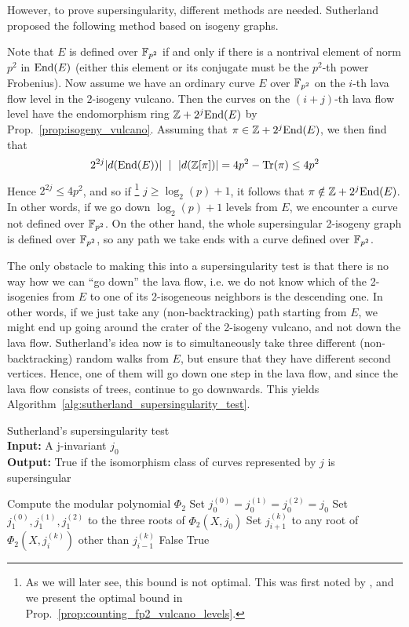 However, to prove supersingularity, different methods are needed.
Sutherland \cite{sutherland_supersingularity_test} proposed the following method based on isogeny graphs.

Note that $E$ is defined over $\mathbb{F}_{p^2}$ if and only if there is a nontrival element of norm $p^2$ in $\mathrm{End}(E)$ (either this element or its conjugate must be the $p^2$-th power Frobenius).
Now assume we have an ordinary curve $E$ over $\mathbb{F}_{p^2}$ on the $i$-th lava flow level in the $2$-isogeny vulcano.
Then the curves on the $(i + j)$-th lava flow level have the endomorphism ring $\mathbb{Z} + 2^j\mathrm{End}(E)$ by Prop.~\ref{prop:isogeny_vulcano}.
Assuming that $\pi \in \mathbb{Z} + 2^j\mathrm{End}(E)$, we then find that
\begin{equation*}
    2^{2j} |d(\mathrm{End}(E))| \ \mid \  |d(\mathbb{Z}[\pi])| = 4p^2 - \mathrm{Tr}(\pi) \leq 4p^2
\end{equation*}
Hence $2^{2j} \leq 4p^2$, and so if
\footnote{As we will later see, this bound is not optimal. This was first noted by \cite{fp_supersingularity_tests}, and we present the optimal bound in Prop.~\ref{prop:counting_fp2_vulcano_levels}.}
$j \geq \log_2(p) + 1$, it follows that $\pi \notin \mathbb{Z} + 2^j\mathrm{End}(E)$.
In other words, if we go down $\log_2(p) + 1$ levels from $E$, we encounter a curve not defined over $\mathbb{F}_{p^2}$.
On the other hand, the whole supersingular 2-isogeny graph is defined over $\mathbb{F}_{p^2}$, so any path we take ends with a curve defined over $\mathbb{F}_{p^2}$.

The only obstacle to making this into a supersingularity test is that there is no way how we can ``go down'' the lava flow, i.e. we do not know which of the 2-isogenies from $E$ to one of its 2-isogeneous neighbors is the descending one.
In other words, if we just take any (non-backtracking) path starting from $E$, we might end up going around the crater of the 2-isogeny vulcano, and not down the lava flow.
Sutherland's idea now is to simultaneously take three different (non-backtracking) random walks from $E$, but ensure that they have different second vertices.
Hence, one of them will go down one step in the lava flow, and since the lava flow consists of trees, continue to go downwards.
This yields Algorithm~\ref{alg:sutherland_supersingularity_test}.
\begin{algorithm}
\caption{\label{alg:sutherland_supersingularity_test} Sutherland's supersingularity test\\
\textbf{Input:} A j-invariant $j_0$\\
\textbf{Output:} True if the isomorphism class of curves represented by $j$ is supersingular}
\begin{algorithmic}[1]
\State Compute the modular polynomial $\Phi_2$
\State Set $j_0^{(0)} = j_0^{(1)} = j_0^{(2)} = j_0$
\State Set $j_1^{(0)}, j_1^{(1)}, j_1^{(2)}$ to the three roots of $\Phi_2(X, j_0)$
        \State Set $j_{i + 1}^{(k)}$ to any root of $\Phi_2(X, j_i^{(k)})$ other than $j_{i - 1}^{(k)}$
            \Return False
        \EndIf
    \EndFor
\EndFor
\State \Return True
\end{algorithmic}
\end{algorithm}

